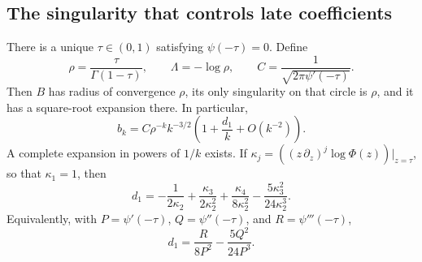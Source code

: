 \subsection{The singularity that controls late coefficients}

\begin{theorem}\label{thm:late}
There is a unique \(\tau\in(0,1)\) satisfying \(\psi(-\tau)=0\).
Define
\begin{equation}\label{eq:constants}
 \rho=\frac{\tau}{\Gamma(1-\tau)},\qquad
 \Lambda=-\log\rho,\qquad
 C=\frac1{\sqrt{2\pi\psi'(-\tau)}}.
\end{equation}
Then \(B\) has radius of convergence \(\rho\), its only singularity on
that circle is \(\rho\), and it has a square-root expansion there.
In particular,
\begin{equation}\label{eq:late}
 b_k=C\rho^{-k}k^{-3/2}
       \left(1+\frac{d_1}{k}+O(k^{-2})\right).
\end{equation}
A complete expansion in powers of \(1/k\) exists. If
\(\kappa_j=((z\,\partial_z)^j\log\Phi(z))|_{z=\tau}\), so that
\(\kappa_1=1\), then
\begin{equation}\label{eq:d1}
 d_1=-\frac1{2\kappa_2}
      +\frac{\kappa_3}{2\kappa_2^2}
      +\frac{\kappa_4}{8\kappa_2^2}
      -\frac{5\kappa_3^2}{24\kappa_2^3}.
\end{equation}
Equivalently, with \(P=\psi'(-\tau)\), \(Q=\psi''(-\tau)\),
and \(R=\psi'''(-\tau)\),
\begin{equation}\label{eq:d1-polygamma}
 d_1=\frac{R}{8P^2}-\frac{5Q^2}{24P^3}.
\end{equation}
\end{theorem}

